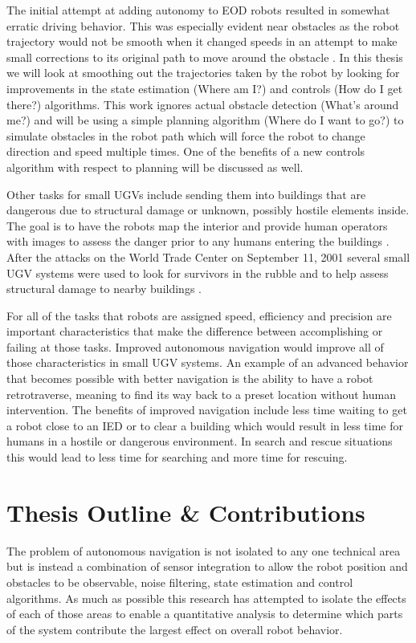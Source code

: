 The initial attempt at adding autonomy to EOD robots resulted in somewhat erratic driving behavior. This was especially evident near obstacles as the robot trajectory would not be smooth when it changed speeds in an attempt to make small corrections to its original path to move around the obstacle \cite{Bruch00}. In this thesis we will look at smoothing out the trajectories taken by the robot by looking for improvements in the state estimation (Where am I?) and controls (How do I get there?) algorithms. This work ignores actual obstacle detection (What's around me?) and will be using a simple planning algorithm (Where do I want to go?) to simulate obstacles in the robot path which will force the robot to change direction and speed multiple times. One of the benefits of a new controls algorithm with respect to planning will be discussed as well.

Other tasks for small UGVs include sending them into buildings that are dangerous due to structural damage or unknown, possibly hostile elements inside. The goal is to have the robots map the interior and provide human operators with images to assess the danger prior to any humans entering the buildings \cite{CongressUGV06}. After the attacks on the World Trade Center on September 11, 2001 several small UGV systems were used to look for survivors in the rubble and to help assess structural damage to nearby buildings \cite{Everett02}.

For all of the tasks that robots are assigned speed, efficiency and precision are important characteristics that make the difference between accomplishing or failing at those tasks. Improved autonomous navigation would improve all of those characteristics in small UGV systems. An example of an advanced behavior that becomes possible with better navigation is the ability to have a robot retrotraverse, meaning to find its way back to a preset location without human intervention. The benefits of improved navigation include less time waiting to get a robot close to an IED or to clear a building which would result in less time for humans in a hostile or dangerous environment. In search and rescue situations this would lead to less time for searching and more time for rescuing.

\section{Thesis Outline \& Contributions}
\label{sec:outline}
The problem of autonomous navigation is not isolated to any one technical area but is instead a combination of sensor integration to allow the robot position and obstacles to be observable, noise filtering, state estimation and control algorithms. As much as possible this research has attempted to isolate the effects of each of those areas to enable a quantitative analysis to determine which parts of the system contribute the largest effect on overall robot behavior.

